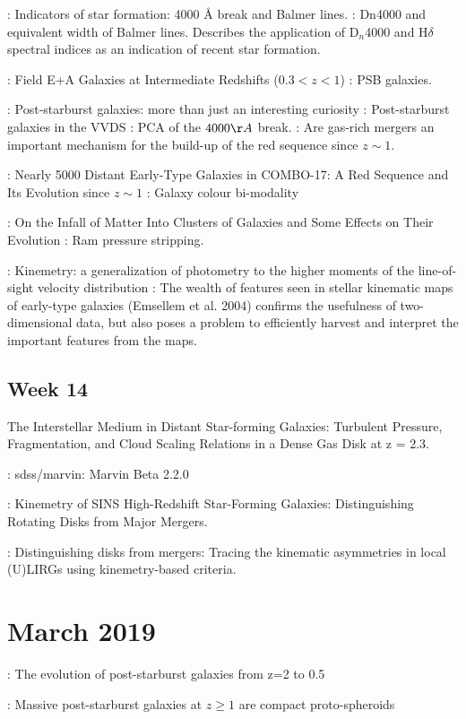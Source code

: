 \documentclass[ceqn,usenatbib,onecolumn]{mnras}
\begin{document}
\par \citet{1997A&A...325.1025P} : {Indicators of star formation: 4000 {\r{A}} break and Balmer lines.} : Dn4000 and equivalent width of Balmer lines. Describes the application of D$_n$4000 and H$\delta$ spectral indices as an indication of recent star formation. 
\par \citet{2004ApJ...609..683T} : {Field E+A Galaxies at Intermediate Redshifts ($0.3 < z < 1$)} : PSB galaxies.
\par \citet{2009MNRAS.395..144W} : {Post-starburst galaxies: more than just an interesting curiosity} : {Post-starburst galaxies in the VVDS : PCA of the $4000\AA$ break.} : Are gas-rich mergers an important mechanism for the build-up of the red sequence since $z\sim1$.
\par \citet{2004ApJ...608..752B} : {Nearly 5000 Distant Early-Type Galaxies in COMBO-17: A Red Sequence and Its Evolution since $z\sim1$} : Galaxy colour bi-modality
\par \citet{1972ApJ...176....1G} : {On the Infall of Matter Into Clusters of Galaxies and Some Effects on Their Evolution} : Ram pressure stripping.
\par \citet{2006MNRAS.366..787K} : {Kinemetry: a generalization of photometry to the higher moments of the line-of-sight velocity distribution} : The wealth of features seen in stellar kinematic maps of early-type galaxies (Emsellem et al. 2004) confirms the usefulness of two-dimensional data, but also poses a problem to efficiently harvest and interpret the important features from the maps.
\subsection{Week 14}
\par \citet{2011ApJ...742...11S} The Interstellar Medium in Distant Star-forming Galaxies: Turbulent Pressure, Fragmentation, and Cloud Scaling Relations in a Dense Gas Disk at z = 2.3.
\par \citet{brian_cherinka_2018_1146705} : sdss/marvin: Marvin Beta 2.2.0
\par \citet{2008ApJ...682..231S} : {Kinemetry of SINS High-Redshift Star-Forming Galaxies: Distinguishing Rotating Disks from Major Mergers}.
\par \citet{2016A&A...591A..85B} : {Distinguishing disks from mergers: Tracing the kinematic asymmetries in local (U)LIRGs using kinemetry-based criteria}.

\section{March 2019}
\citet{2016MNRAS.463..832W} : The evolution of post-starburst galaxies from z=2 to 0.5
\par \citet{2017MNRAS.472.1401A} : Massive post-starburst galaxies at $z \ge 1$ are compact proto-spheroids
\end{document}
